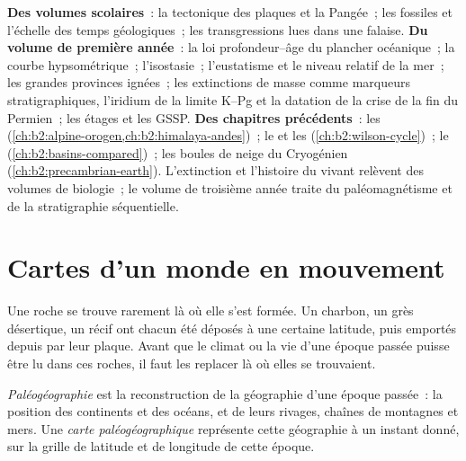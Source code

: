 \begin{recall}
\textbf{Des volumes scolaires}~: la tectonique des plaques et la Pangée~; les fossiles et l'échelle des temps
géologiques~; les transgressions lues dans une falaise. \textbf{Du volume de première année}~: la loi
profondeur--âge du plancher océanique~; la courbe hypsométrique~; l'isostasie~; l'eustatisme et le niveau relatif de
la mer~; les grandes provinces ignées~; les extinctions de masse comme marqueurs stratigraphiques, l'iridium
de la limite K--Pg et la datation de la crise de la fin du Permien~; les étages et les GSSP. \textbf{Des chapitres
précédents}~: les  (\cref{ch:b2:alpine-orogen,ch:b2:himalaya-andes})~; le  et les
 (\cref{ch:b2:wilson-cycle})~; le  (\cref{ch:b2:basins-compared})~; les boules de
neige du Cryogénien (\cref{ch:b2:precambrian-earth}). L'extinction et l'histoire du vivant relèvent des volumes
de biologie~; le volume de troisième année traite du paléomagnétisme et de la stratigraphie séquentielle.
\end{recall}

\section{Cartes d'un monde en mouvement}\label{sec:b2:phanerozoic-earth:maps}

Une roche se trouve rarement là où elle s'est formée. Un charbon, un grès désertique, un récif ont chacun
été déposés à une certaine latitude, puis emportés depuis par leur plaque. Avant que le climat ou la
vie d'une époque passée puisse être lu dans ces roches, il faut les replacer là où elles se trouvaient.

\begin{definition}\label{def:b2:phanerozoic-earth:palaeogeography}
\emph{Paléogéographie} est la reconstruction de la géographie d'une
époque passée~: la position des continents et des océans, et de leurs rivages, chaînes de montagnes
et mers. Une \emph{carte paléogéographique} représente
cette géographie à un instant donné, sur la grille de latitude et de longitude de cette époque.
\end{definition}

